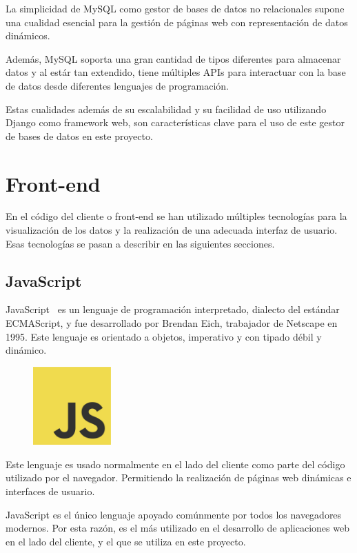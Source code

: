 \documentclass[a4paper, spanish, 12pt]{book}
\begin{document}
La simplicidad de MySQL como gestor de bases de datos no relacionales supone una
cualidad esencial para la gesti\'on de p\'aginas web con representaci\'on de datos
din\'amicos.

Adem\'as, MySQL soporta una gran cantidad de tipos diferentes para almacenar datos
y al est\'ar tan extendido, tiene m\'ultiples APIs para interactuar con la base de datos desde
diferentes lenguajes de programaci\'on.

Estas cualidades adem\'as de su escalabilidad y su facilidad de uso utilizando Django
como framework web, son caracter\'isticas clave para el uso de este gestor de bases
de datos en este proyecto.

\section{Front-end}
\label{sec:front-end}

En el c\'odigo del cliente o front-end se han utilizado m\'ultiples tecnolog\'ias
para la visualizaci\'on de los datos y la realizaci\'on de una adecuada interfaz
de usuario. Esas tecnolog\'ias se pasan a describir en las siguientes secciones.

\subsection{JavaScript}
\label{subsec:js}

JavaScript~\cite{js} es un lenguaje de programaci\'on interpretado, dialecto del est\'andar
ECMAScript, y fue desarrollado por Brendan Eich, trabajador de Netscape en 1995.
Este lenguaje es orientado a objetos, imperativo y con tipado d\'ebil y din\'amico.

\begin{figure}[H]
  \centering
  \includegraphics[width=3cm, keepaspectratio]{img/js-logo}
\end{figure}

Este lenguaje es usado normalmente en el lado del cliente como parte del c\'odigo
utilizado por el navegador. Permitiendo la realizaci\'on de p\'aginas web din\'amicas
e interfaces de usuario.

JavaScript es el \'unico lenguaje apoyado com\'unmente por todos los navegadores modernos.
Por esta raz\'on, es el m\'as utilizado en el desarrollo de aplicaciones web en el
lado del cliente, y el que se utiliza en este proyecto.
\end{document}
